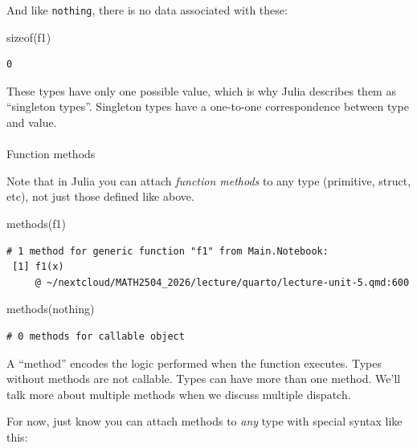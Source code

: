 \documentclass[
]{article}
\makeatletter
\let\oldparagraph\paragraph
\renewcommand{\paragraph}{
    \@ifstar
      \xxxParagraphStar
      \xxxParagraphNoStar
  }
\newcommand{\xxxParagraphStar}[1]{\oldparagraph*{#1}\mbox{}}
\newcommand{\xxxParagraphNoStar}[1]{\oldparagraph{#1}\mbox{}}
\newenvironment{Shaded}{\begin{snugshade}}{\end{snugshade}}
\newcommand{\ConstantTok}[1]{\textcolor[rgb]{0.56,0.35,0.01}{#1}}
\newcommand{\FunctionTok}[1]{\textcolor[rgb]{0.28,0.35,0.67}{#1}}
\newcommand{\NormalTok}[1]{\textcolor[rgb]{0.00,0.23,0.31}{#1}}
\makeatother
\begin{document}
And like \texttt{nothing}, there is no data associated with these:

\begin{Shaded}
\begin{Highlighting}[]
\FunctionTok{sizeof}\NormalTok{(f1)}
\end{Highlighting}
\end{Shaded}

\begin{verbatim}
0
\end{verbatim}

These types have only one possible value, which is why Julia describes
them as ``singleton types''. Singleton types have a one-to-one
correspondence between type and value.

\paragraph{Function methods}\label{function-methods}

Note that in Julia you can attach \emph{function methods} to any type
(primitive, struct, etc), not just those defined like above.

\begin{Shaded}
\begin{Highlighting}[]
\FunctionTok{methods}\NormalTok{(f1)}
\end{Highlighting}
\end{Shaded}

\begin{verbatim}
# 1 method for generic function "f1" from Main.Notebook:
 [1] f1(x)
     @ ~/nextcloud/MATH2504_2026/lecture/quarto/lecture-unit-5.qmd:600
\end{verbatim}

\begin{Shaded}
\begin{Highlighting}[]
\FunctionTok{methods}\NormalTok{(}\ConstantTok{nothing}\NormalTok{)}
\end{Highlighting}
\end{Shaded}

\begin{verbatim}
# 0 methods for callable object
\end{verbatim}

A ``method'' encodes the logic performed when the function executes.
Types without methods are not callable. Types can have more than one
method. We'll talk more about multiple methods when we discuss multiple
dispatch.

For now, just know you can attach methods to \emph{any} type with
special syntax like this:
\end{document}
